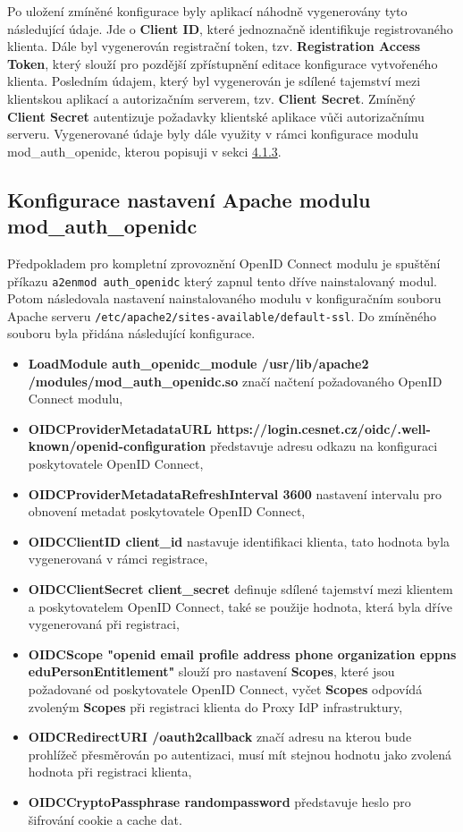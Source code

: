 \documentclass[
  printed, %
  twoside, %
  table,   %
  nolof,     %
  nolot,     %
]{fithesis3}
\begin{document}
Po uložení zmíněné konfigurace byly aplikací náhodně vygenerovány tyto následující údaje. Jde o \textbf{Client ID}, které jednoznačně identifikuje registrovaného klienta. Dále byl vygenerován registrační token, tzv. \textbf{Registration Access Token}, který slouží pro pozdější zpřístupnění editace konfigurace vytvořeného klienta. Posledním údajem, který byl vygenerován je sdílené tajemství mezi klientskou aplikací a autorizačním serverem, tzv. \textbf{Client Secret}. Zmíněný \textbf{Client Secret} autentizuje požadavky klientské aplikace vůči autorizačnímu serveru. Vygenerované údaje byly dále využity v rámci konfigurace modulu mod\_auth\_openidc, kterou popisuji v sekci \hyperref[sec:mod-conf]{4.1.3}.

\subsection{Konfigurace nastavení Apache modulu mod\_auth\_openidc} 
\label{sec:mod-conf}
Předpokladem pro kompletní zprovoznění OpenID Connect modulu je spuštění příkazu \texttt{a2enmod auth\_openidc} který zapnul tento dříve nainstalovaný modul. Potom následovala nastavení nainstalovaného modulu v konfiguračním souboru Apache serveru \texttt{/etc/apache2/sites-available/default-ssl}. Do zmíněného souboru byla přidána následující konfigurace.

\begin{itemize}
    \item \textbf{LoadModule auth\_openidc\_module /usr/lib/apache2\\ /modules/mod\_auth\_openidc.so} značí načtení požadovaného OpenID Connect modulu, 
    \item \textbf{OIDCProviderMetadataURL https://login.cesnet.cz/oidc/.well-known/openid-configuration} představuje adresu odkazu na konfiguraci poskytovatele OpenID Connect, 
    \item \textbf{OIDCProviderMetadataRefreshInterval 3600} nastavení intervalu pro obnovení metadat poskytovatele OpenID Connect, 
    \item \textbf{OIDCClientID client\_id} nastavuje identifikaci klienta, tato hodnota byla vygenerovaná v rámci registrace,
    \item \textbf{OIDCClientSecret client\_secret} definuje sdílené tajemství mezi klientem a poskytovatelem OpenID Connect, také se použije hodnota, která byla dříve vygenerovaná při registraci,
    \item \textbf{OIDCScope "openid email profile address phone organization eppns eduPersonEntitlement"} slouží pro nastavení \textbf{Scopes}, které jsou požadované od poskytovatele OpenID Connect, vyčet \textbf{Scopes} odpovídá zvoleným \textbf{Scopes} při registraci klienta do Proxy IdP infrastruktury,
    \item \textbf{OIDCRedirectURI /oauth2callback} značí adresu na kterou bude prohlížeč přesměrován po autentizaci, musí mít stejnou hodnotu jako zvolená hodnota při registraci klienta, 
    \item \textbf{OIDCCryptoPassphrase randompassword} představuje heslo pro šifrování cookie a cache dat. 
\end{itemize}
\end{document}
